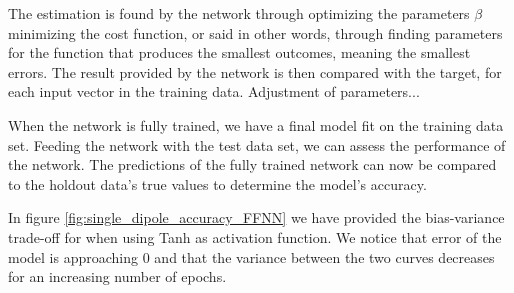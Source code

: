 \documentclass[a4paper, UKenglish, 11pt]{uiomaster}
\begin{document}
The estimation is found by the network through optimizing the parameters $\beta$ minimizing the cost function, or said in other words, through finding parameters for the function that produces the smallest outcomes, meaning the smallest errors. The result provided by the network is then compared with the target, for each input vector in the training data. Adjustment of parameters...

When the network is fully trained, we have a final model fit on the training data set. Feeding the network with the test data set, we can assess the performance of the network. The predictions of the fully trained network can now be compared to the holdout data's true values to determine the model's accuracy.

In figure \ref{fig:single_dipole_accuracy_FFNN} we have provided the bias-variance trade-off for when using Tanh as activation function. We notice that error of the model is approaching 0 and that the variance between the two curves decreases for an increasing number of epochs.


\end{document}
